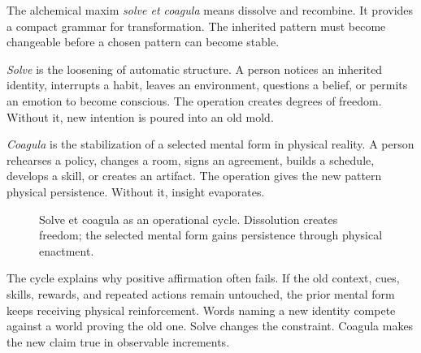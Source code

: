 \documentclass[11pt]{article}
\theoremstyle{plain}
\theoremstyle{definition}
\begin{document}
The alchemical maxim \emph{solve et coagula} means dissolve and recombine. It provides
a compact grammar for transformation. The inherited pattern must become changeable
before a chosen pattern can become stable.

\emph{Solve} is the loosening of automatic structure. A person notices an inherited
identity, interrupts a habit, leaves an environment, questions a belief, or permits an
emotion to become conscious. The operation creates degrees of freedom. Without it,
new intention is poured into an old mold.

\emph{Coagula} is the stabilization of a selected mental form in physical reality. A
person rehearses a policy, changes a room, signs an agreement, builds a schedule,
develops a skill, or creates an artifact. The operation gives the new pattern physical
persistence. Without it, insight evaporates.

\begin{figure}[t]
\centering
{}
\caption{Solve et coagula as an operational cycle. Dissolution creates freedom; the
selected mental form gains persistence through physical enactment.}
\label{fig:solve-coagula}
\end{figure}

The cycle explains why positive affirmation often fails. If the old context, cues,
skills, rewards, and repeated actions remain untouched, the prior mental form keeps
receiving physical reinforcement. Words naming a new identity compete against a world
proving the old one. Solve changes the constraint. Coagula makes the new claim true in
observable increments.
\end{document}
